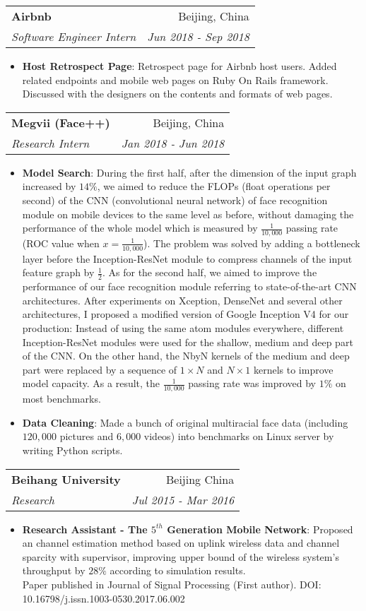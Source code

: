 \documentclass[letterpaper,11pt]{article}
\makeatletter
\newcommand{\resumeItem}[2]{
	\item\small{
		\textbf{#1}{: #2 \vspace{-2pt}}
	}
}
\newcommand{\resumeSubheading}[4]{
	\vspace{-1pt}\item
	\begin{tabular*}{0.97\textwidth}[t]{l@{\extracolsep{\fill}}r}
		\textbf{#1} & #2 \\
		\textit{\small#3} & \textit{\small #4} \\
	\end{tabular*}\vspace{-5pt}
}
\newcommand{\resumeSubSubheading}[2]{
	\begin{tabular*}{0.97\textwidth}{l@{\extracolsep{\fill}}r}
		\textit{\small#1} & \textit{\small #2} \\
	\end{tabular*}\vspace{-5pt}
}
\newcommand{\resumeSubHeadingListEnd}{\end{itemize}}
\newcommand{\resumeItemListStart}{\begin{itemize}}
\newcommand{\resumeItemListEnd}{\end{itemize}\vspace{-5pt}}
\makeatother
\begin{document}
	
	
	
	\resumeSubheading
	{Airbnb}{Beijing, China}
	{Software Engineer Intern}{Jun 2018 - Sep 2018}
	\resumeItemListStart
	\resumeItem{Host Retrospect Page}
	{Retrospect page for Airbnb host users. Added related endpoints and mobile web pages on Ruby On Rails framework. Discussed with the designers on the contents and formats of web pages.}
	\resumeItemListEnd
	
	\resumeSubheading
	{Megvii (Face++)}{Beijing, China}
	{Research Intern}{Jan 2018 - Jun 2018}
	\resumeItemListStart
	\resumeItem{Model Search}
	{During the first half, after the dimension of the input graph increased by $14\%$, we aimed to reduce the FLOPs (float operations per second) of the CNN (convolutional neural network) of face recognition module on mobile devices to the same level as before, without damaging the performance of the whole model which is measured by $\frac{1}{10,000}$ passing rate (ROC value when $x=\frac{1}{10,000}$). The problem was solved by adding a bottleneck layer before the Inception-ResNet module to compress channels of the input feature graph by $\frac{1}{2}$. As for the second half, we aimed to improve the performance of our face recognition module referring to state-of-the-art CNN architectures. After experiments on Xception, DenseNet and several other architectures, I proposed a modified version of Google Inception V4 for our production: Instead of using the same atom modules everywhere, different Inception-ResNet modules were used for the shallow, medium and deep part of the CNN. On the other hand, the NbyN kernels of the medium and deep part were replaced by a sequence of $1 \times N$ and $N \times 1$ kernels to improve model capacity. As a result, the $\frac{1}{10,000}$ passing rate was improved by $1\%$ on most benchmarks.}
	\resumeItem{Data Cleaning}
	{Made a bunch of original multiracial face data (including $120,000$ pictures and $6,000$ videos) into benchmarks on Linux server by writing Python scripts.}
	\resumeItemListEnd
	
	\resumeSubheading
	{Beihang University}{Beijing China}
	{Research}{Jul 2015 - Mar 2016}
	\resumeItemListStart
	\resumeItem{Research Assistant - The $5^{th}$ Generation Mobile Network}
	{Proposed an channel estimation method based on uplink wireless data and channel sparcity with supervisor, improving upper bound of the wireless system's throughput by $28\%$ according to simulation results.\\Paper published in Journal of Signal Processing (First author). DOI: 10.16798/j.issn.1003-0530.2017.06.002}
	\resumeItemListEnd
	
\end{document}
